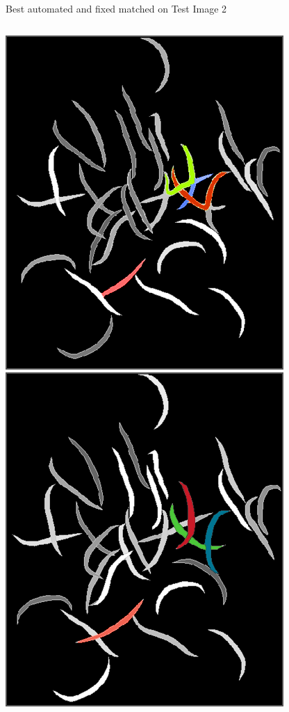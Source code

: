 \documentclass[xcolor=table]{beamer}
\begin{document}
\begin{frame}{Best automated and fixed matched on Test Image 2}
\begin{columns}[c]
\column{2.3in}
\includegraphics[scale=0.4]{results/test2/guessing-nobgframe}
\column{2.3in}
\includegraphics[scale=0.4]{results/test2/frame2-allnobg}
\end{columns}

\end{frame}
\end{document}
